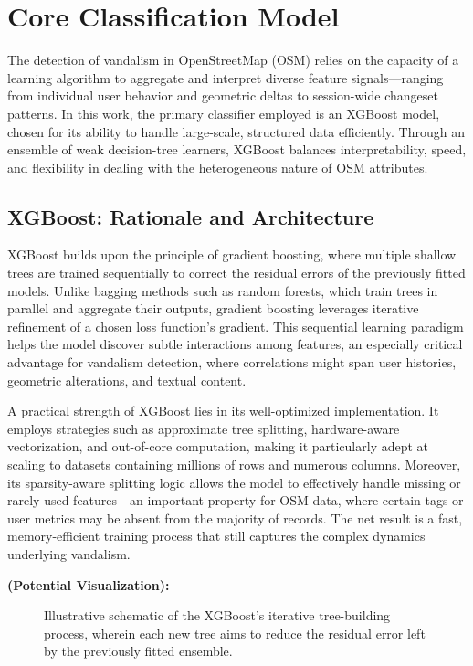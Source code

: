 \documentclass[
    13pt, %
    a4paper, %
    twoside, 
    DIV14, %
    listof=totoc, %
    bibliography=totoc, %
    index=totoc, %
    headsepline
]{scrreprt}
\begin{document}
\section{Core Classification Model}
\label{sec:core_classification_model}

The detection of vandalism in OpenStreetMap (OSM) relies on the capacity of a learning algorithm to aggregate and interpret diverse feature signals—ranging from individual user behavior and geometric deltas to session-wide changeset patterns. In this work, the primary classifier employed is an XGBoost model, chosen for its ability to handle large-scale, structured data efficiently. Through an ensemble of weak decision-tree learners, XGBoost balances interpretability, speed, and flexibility in dealing with the heterogeneous nature of OSM attributes.

\subsection{XGBoost: Rationale and Architecture}
\label{sec:xgboost_rationale_architecture}

XGBoost builds upon the principle of gradient boosting, where multiple shallow trees are trained sequentially to correct the residual errors of the previously fitted models. Unlike bagging methods such as random forests, which train trees in parallel and aggregate their outputs, gradient boosting leverages iterative refinement of a chosen loss function’s gradient. This sequential learning paradigm helps the model discover subtle interactions among features, an especially critical advantage for vandalism detection, where correlations might span user histories, geometric alterations, and textual content.

A practical strength of XGBoost lies in its well-optimized implementation. It employs strategies such as approximate tree splitting, hardware-aware vectorization, and out-of-core computation, making it particularly adept at scaling to datasets containing millions of rows and numerous columns. Moreover, its sparsity-aware splitting logic allows the model to effectively handle missing or rarely used features—an important property for OSM data, where certain tags or user metrics may be absent from the majority of records. The net result is a fast, memory-efficient training process that still captures the complex dynamics underlying vandalism.

\noindent
\textbf{(Potential Visualization):}  
\begin{figure}[htbp]
    \centering
    \caption{Illustrative schematic of the XGBoost’s iterative tree-building process, wherein each new tree aims to reduce the residual error left by the previously fitted ensemble.}
    \label{fig:xgboost_schematic}
\end{figure}
\end{document}
